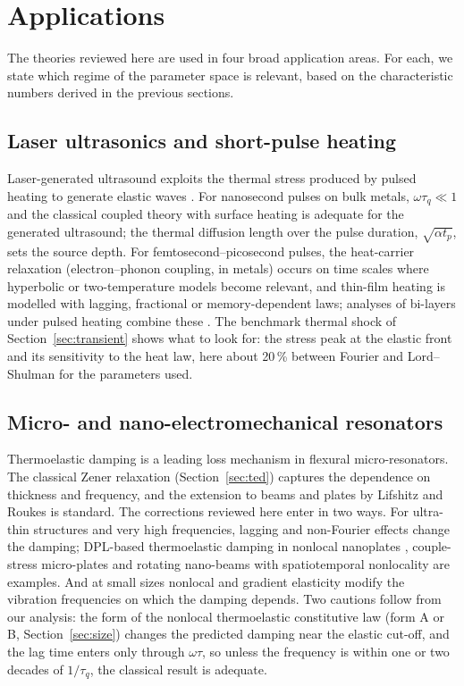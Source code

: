 \section{Applications}\label{sec:applications}
The theories reviewed here are used in four broad application areas. For each, we state which regime of the parameter space is relevant, based on the characteristic numbers derived in the previous sections.

\subsection{Laser ultrasonics and short-pulse heating}
Laser-generated ultrasound exploits the thermal stress produced by pulsed heating to generate elastic waves \citep{Scruby1990}. For nanosecond pulses on bulk metals, $\omega\tau_q\ll1$ and the classical coupled theory with surface heating is adequate for the generated ultrasound; the thermal diffusion length over the pulse duration, $\sqrt{\alpha t_p}$, sets the source depth. For femtosecond--picosecond pulses, the heat-carrier relaxation (electron--phonon coupling, in metals) occurs on time scales where hyperbolic or two-temperature models become relevant, and thin-film heating is modelled with lagging, fractional or memory-dependent laws; analyses of bi-layers under pulsed heating combine these \citep{Li2019}. The benchmark thermal shock of Section~\ref{sec:transient} shows what to look for: the stress peak at the elastic front and its sensitivity to the heat law, here about 20\,\% between Fourier and Lord--Shulman for the parameters used.

\subsection{Micro- and nano-electromechanical resonators}
Thermoelastic damping is a leading loss mechanism in flexural micro-resonators. The classical Zener relaxation (Section~\ref{sec:ted}) captures the dependence on thickness and frequency, and the extension to beams and plates by Lifshitz and Roukes \citep{Lifshitz2000} is standard. The corrections reviewed here enter in two ways. For ultra-thin structures and very high frequencies, lagging and non-Fourier effects change the damping; DPL-based thermoelastic damping in nonlocal nanoplates \citep{Yang2021}, couple-stress micro-plates \citep{Kumar2017} and rotating nano-beams with spatiotemporal nonlocality \citep{Sur2025} are examples. And at small sizes nonlocal and gradient elasticity modify the vibration frequencies on which the damping depends. Two cautions follow from our analysis: the form of the nonlocal thermoelastic constitutive law (form A or B, Section~\ref{sec:size}) changes the predicted damping near the elastic cut-off, and the lag time enters only through $\omega\tau$, so unless the frequency is within one or two decades of $1/\tau_q$, the classical result is adequate.

